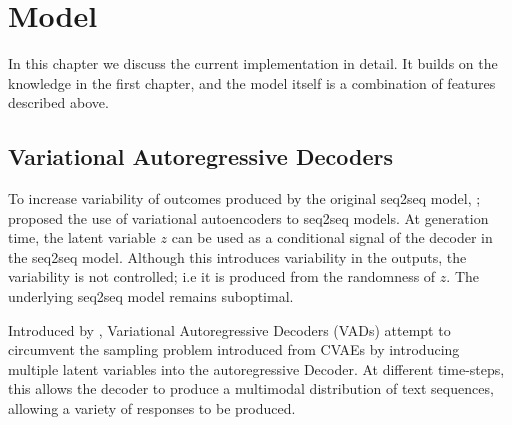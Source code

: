 \documentclass[12pt,twoside]{report}
\begin{document}





\chapter{Model}

In this chapter we discuss the current implementation in detail. It builds on the knowledge in the first chapter, and the model itself is a combination of features described above.

\section{Variational Autoregressive Decoders}

To increase variability of outcomes produced by the original seq2seq model, \cite{serban_hierarchical_2016}; \cite{zhao_learning_2017} proposed the use of variational autoencoders to seq2seq models. At generation time, the latent variable $z$ can be used as a conditional signal of the decoder in the seq2seq model. Although this introduces variability in the outputs, the variability is not controlled; i.e it is produced from the randomness of $z$. The underlying seq2seq model remains suboptimal.

Introduced by \cite{du_variational_2018}, Variational Autoregressive Decoders (VADs) attempt to circumvent the sampling problem introduced from CVAEs by introducing multiple latent variables into the autoregressive Decoder. At different time-steps, this allows the decoder to produce a multimodal distribution of text sequences, allowing a variety of responses to be produced. 
\end{document}
